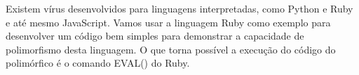 Existem vírus desenvolvidos para linguagens interpretadas, como Python e Ruby e até mesmo JavaScript. Vamos usar a linguagem Ruby como exemplo para desenvolver um código bem simples para demonstrar a capacidade de polimorfismo desta linguagem. O que torna possível a execução do código do polimórfico é o comando EVAL() do Ruby. 
